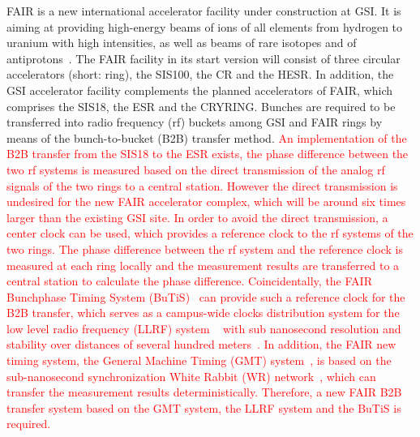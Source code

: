 FAIR is a new international accelerator facility under construction at GSI. It is aiming at providing high-energy beams of ions of all elements from hydrogen to uranium with high intensities, as well as beams of rare isotopes and of antiprotons~\cite{eschke_international_2005, noauthor_fair_2011}. The FAIR facility in its start version will consist of three circular accelerators (short: ring), the SIS100, the CR and the HESR. In addition, the GSI accelerator facility complements the planned accelerators of FAIR, which comprises the SIS18, the ESR and the CRYRING. Bunches are required to be transferred into radio frequency (rf) buckets among GSI and FAIR rings by means of the bunch-to-bucket (B2B) transfer method. \textcolor{red}{An implementation of the B2B transfer from the SIS18 to the ESR exists, the phase difference between the two rf systems is measured based on the direct transmission of the analog rf signals of the two rings to a central station. However the direct transmission is undesired for the new FAIR accelerator complex, which will be around six times larger than the existing GSI site. In order to avoid the direct transmission, a center clock can be used, which provides a reference clock to the rf systems of the two rings. The phase difference between the rf system and the reference clock is measured at each ring locally and the measurement results are transferred to a central station to calculate the phase difference. Coincidentally, the FAIR Bunchphase Timing System (BuTiS)~\cite{moritz_butisdevelopment_2006} can provide such a reference clock for the B2B transfer, which serves as a campus-wide clocks distribution system for the low level radio frequency (LLRF) system ~\cite{klingbeil_new_2011} with sub nanosecond resolution and stability over distances of several hundred meters~\cite{moritz_f-cs-rf-14e_2012}. In addition, the FAIR new timing system, the General Machine Timing (GMT) system~\cite{beck_general_2013}, is based on the sub-nanosecond synchronization White Rabbit (WR) network~\cite{beck_white_2011}, which can transfer the measurement results deterministically. Therefore, a new FAIR B2B transfer system based on the GMT system, the LLRF system and the BuTiS is required. }

